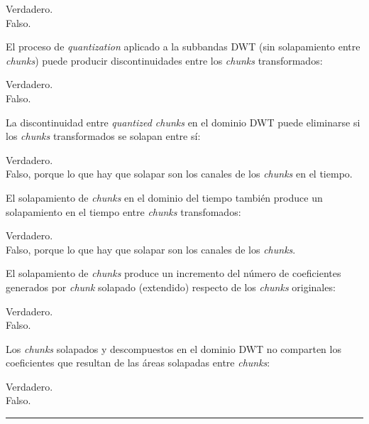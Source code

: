 \documentclass[legalpaper, 12pt, addpoints]{exam}
\begin{document}
\begin{questions}
\begin{oneparchoices}
  \choice Verdadero.\\
  \choice Falso.
\end{oneparchoices}
  
\vspace{0.10in}

\question El proceso de \emph{quantization} aplicado a la subbandas DWT (sin solapamiento entre \emph{chunks})
puede producir discontinuidades entre los \emph{chunks} transformados:

\begin{oneparchoices}
  \choice Verdadero.\\
  \choice Falso.
\end{oneparchoices}
  
\vspace{0.10in}

\question La discontinuidad entre \emph{quantized chunks} en el dominio
DWT puede eliminarse si los \emph{chunks} transformados se solapan entre sí:

\begin{oneparchoices}
  \choice Verdadero.\\
  \choice Falso, porque lo que hay que solapar son los canales de los \emph{chunks} en el tiempo.
\end{oneparchoices}
  
\vspace{0.10in}

\question El solapamiento de \emph{chunks} en el dominio del tiempo
también produce un solapamiento en el tiempo entre \emph{chunks}
transfomados:

\begin{oneparchoices}
  \choice Verdadero.\\
  \choice Falso, porque lo que hay que solapar son los canales de los \emph{chunks}.
\end{oneparchoices}
  
\vspace{0.10in}

\question El solapamiento de \emph{chunks} produce un incremento del
número de coeficientes generados por \emph{chunk} solapado (extendido)
respecto de los \emph{chunks} originales:

\begin{oneparchoices}
  \choice Verdadero.\\
  \choice Falso.
\end{oneparchoices}
  
\vspace{0.10in}

\question Los \emph{chunks} solapados y descompuestos en el dominio DWT no comparten los
coeficientes que resultan de las áreas solapadas entre \emph{chunks}:

\begin{oneparchoices}
  \choice Verdadero.\\
  \choice Falso.
\end{oneparchoices}
  
\vspace{0.10in}

\hrule

\end{questions}
\end{document}
